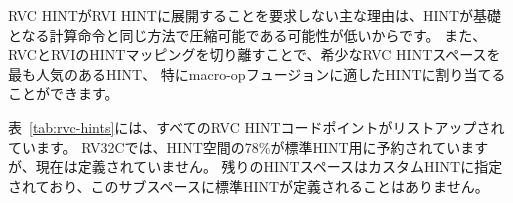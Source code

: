 \begin{commentary}
\begin{comment}
The primary reason to not require an RVC HINT to expand to an RVI HINT
is that HINTs are unlikely to be compressible in the same manner as
the underlying computational instruction.  Also, decoupling the RVC
and RVI HINT mappings allows the scarce RVC HINT space to be allocated
to the most popular HINTs, and in particular, to HINTs that are
amenable to macro-op fusion.
\end{comment}
RVC HINTがRVI HINTに展開することを要求しない主な理由は、HINTが基礎となる計算命令と同じ方法で圧縮可能である可能性が低いからです。
また、RVCとRVIのHINTマッピングを切り離すことで、希少なRVC HINTスペースを最も人気のあるHINT、
特にmacro-opフュージョンに適したHINTに割り当てることができます。
\end{commentary}

\begin{comment}
Table~\ref{tab:rvc-hints} lists all RVC HINT code points.  For RV32C, 78\% of
the HINT space is reserved for standard HINTs, but none are presently defined.
The remainder of the HINT space is designated for custom HINTs; no standard
HINTs will ever be defined in this subspace.
\end{comment}
表~\ref{tab:rvc-hints}には、すべてのRVC HINTコードポイントがリストアップされています。
RV32Cでは、HINT空間の78\%が標準HINT用に予約されていますが、現在は定義されていません。
残りのHINTスペースはカスタムHINTに指定されており、このサブスペースに標準HINTが定義されることはありません。


